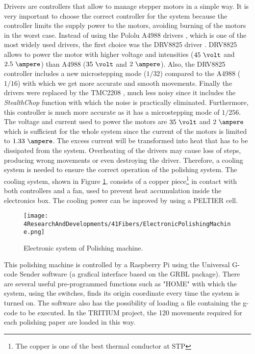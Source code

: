 \begin{enumerate}
Drivers are controllers that allow to manage stepper motors in a simple way. It is very important to choose the correct controller for the system because the controller limits the supply power to the motors, avoiding burning of the motors in the worst case. Instead of using the Pololu A4988 drivers \cite{A4988Driver}, which is one of the most widely used drivers, the first choice was the DRV8825 driver \cite{DRV8825Driver}. DRV8825 allows to power the motor with higher voltage and intensities ($45~\volt$ and $2.5~\ampere$) than A4988 ($35~\volt$ and $2~\ampere$). Also, the DRV8825 controller includes a new microstepping mode ($1/32$) compared to the A4988 ($1/16$) with which we get more accurate and smooth movements. Finally the drivers were replaced by the TMC2208 \cite{TMC2208Driver}, much less noisy since it includes the \textit{StealthChop} function with which the noise is practically eliminated. Furthermore, this controller is much more accurate as it has a microstepping mode of $1/256$. The voltage and current used to power the motors are $35~\volt$ and $2~\ampere$ which is sufficient for the whole system since the current of the motors is limited to $1.33~\ampere$. The excess current will be transformed into heat that has to be dissipated from the system. Overheating of the drivers may cause loss of steps, producing wrong movements or even destroying the driver. Therefore, a cooling system is needed to ensure the correct operation of the polishing system. The cooling system, shown in Figure \ref{fig:ElectronicSystemPolishingMachine}, consists of a copper piece\footnote{The copper is one of the best thermal conductor at STP} in contact with both controllers and a fan, used to prevent heat accumulation inside the electronics box. The cooling power can be inproved by using a PELTIER cell.

\begin{figure}[h]
\centering
\texttt{[image: 4ResearchAndDevelopments/41Fibers/ElectronicPolishingMachine.png]}
\caption{Electronic system of Polishing machine.\label{fig:ElectronicSystemPolishingMachine}}
\end{figure}

\end{enumerate}

This polishing machine is controlled by a Raspberry Pi using the Universal G-code Sender software (a grafical interface based on the GRBL package). There are several useful pre-programmed functions such as "HOME" with which the system, using the switches, finds its origin coordinate every time the system is turned on. The software also has the possibility of loading a file containing the g-code to be executed. In the TRITIUM project, the 120 movements required for each polishing paper are loaded in this way. 

